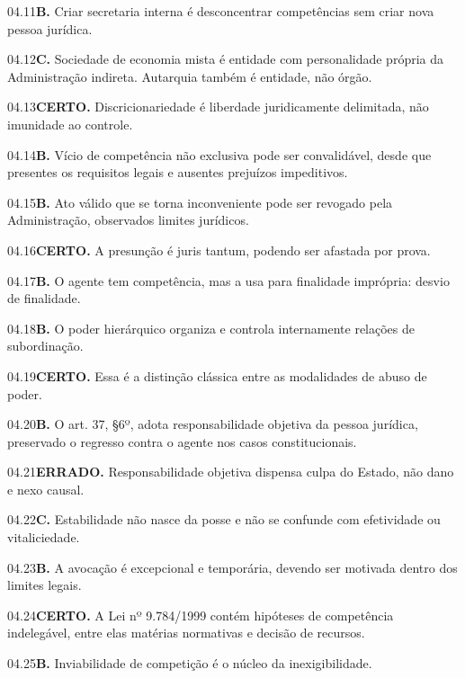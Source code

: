 \begin{solucao}{04.11}\textbf{B.} Criar secretaria interna é desconcentrar competências sem criar nova pessoa jurídica.\end{solucao}
\begin{solucao}{04.12}\textbf{C.} Sociedade de economia mista é entidade com personalidade própria da Administração indireta. Autarquia também é entidade, não órgão.\end{solucao}
\begin{solucao}{04.13}\textbf{CERTO.} Discricionariedade é liberdade juridicamente delimitada, não imunidade ao controle.\end{solucao}
\begin{solucao}{04.14}\textbf{B.} Vício de competência não exclusiva pode ser convalidável, desde que presentes os requisitos legais e ausentes prejuízos impeditivos.\end{solucao}
\begin{solucao}{04.15}\textbf{B.} Ato válido que se torna inconveniente pode ser revogado pela Administração, observados limites jurídicos.\end{solucao}
\begin{solucao}{04.16}\textbf{CERTO.} A presunção é juris tantum, podendo ser afastada por prova.\end{solucao}
\begin{solucao}{04.17}\textbf{B.} O agente tem competência, mas a usa para finalidade imprópria: desvio de finalidade.\end{solucao}
\begin{solucao}{04.18}\textbf{B.} O poder hierárquico organiza e controla internamente relações de subordinação.\end{solucao}
\begin{solucao}{04.19}\textbf{CERTO.} Essa é a distinção clássica entre as modalidades de abuso de poder.\end{solucao}
\begin{solucao}{04.20}\textbf{B.} O art. 37, §6º, adota responsabilidade objetiva da pessoa jurídica, preservado o regresso contra o agente nos casos constitucionais.\end{solucao}
\begin{solucao}{04.21}\textbf{ERRADO.} Responsabilidade objetiva dispensa culpa do Estado, não dano e nexo causal.\end{solucao}
\begin{solucao}{04.22}\textbf{C.} Estabilidade não nasce da posse e não se confunde com efetividade ou vitaliciedade.\end{solucao}
\begin{solucao}{04.23}\textbf{B.} A avocação é excepcional e temporária, devendo ser motivada dentro dos limites legais.\end{solucao}
\begin{solucao}{04.24}\textbf{CERTO.} A Lei nº 9.784/1999 contém hipóteses de competência indelegável, entre elas matérias normativas e decisão de recursos.\end{solucao}
\begin{solucao}{04.25}\textbf{B.} Inviabilidade de competição é o núcleo da inexigibilidade.\end{solucao}

